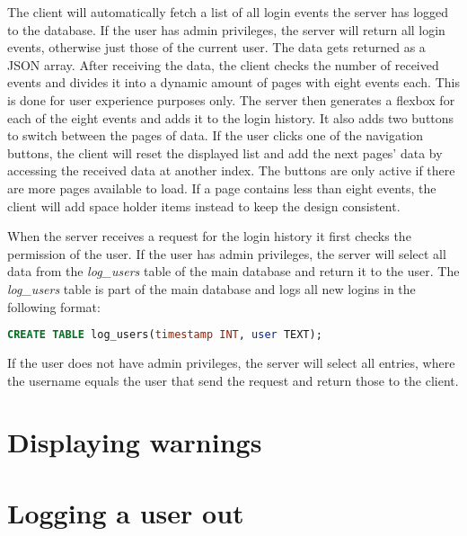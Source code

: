 The client will automatically fetch a list of all login events the server has logged to the database. If the user has admin privileges, the server will return all login events, otherwise just those of the current user. The data gets returned as a JSON array.
After receiving the data, the client checks the number of received events and divides it into a dynamic amount of pages with eight events each. This is done for user experience purposes only. The server then generates a flexbox for each of the eight events and adds it to the login history. It also adds two buttons to switch between the pages of data.
If the user clicks one of the navigation buttons, the client will reset the displayed list and add the next pages' data by accessing the received data at another index.  The buttons are only active if there are more pages available to load.
If a page contains less than eight events, the client will add space holder items instead to keep the design consistent.

When the server receives a request for the login history it first checks the permission of the user. If the user has admin privileges, the server will select all data from the \textit{log\_users} table of the main database and return it to the user.  The \textit{log\_users} table is part of the main database and logs all new logins in the following format:

\begin{lstlisting}[label = lst:log_users, language = SQL, numbers = none]
 CREATE TABLE log_users(timestamp INT, user TEXT);
\end{lstlisting}

If the user does not have admin privileges, the server will select all entries, where the username equals the user that send the request and return those to the client.





\section{Displaying warnings}
\label{sec:displaying_warnings}





\section{Logging a user out}
\label{sec:logging_a_user_out}



